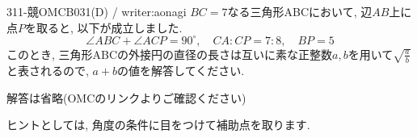\begin{thm}{311}{-競}{OMCB031(D) / writer:aonagi}
$BC=7$なる三角形ABCにおいて, 辺$AB$上に点$P$を取ると, 以下が成立しました. 
\[
\angle{ABC} + \angle{ACP} = 90^{\circ},\quad CA:CP = 7:8,\quad BP = 5
\]
このとき, 三角形ABCの外接円の直径の長さは互いに素な正整数$a,b$を用いて$\sqrt{\frac{a}{b}}$と表されるので, $a+b$の値を解答してください. 
\end{thm}

解答は省略(OMCのリンクよりご確認ください)

ヒントとしては, 角度の条件に目をつけて補助点を取ります. 